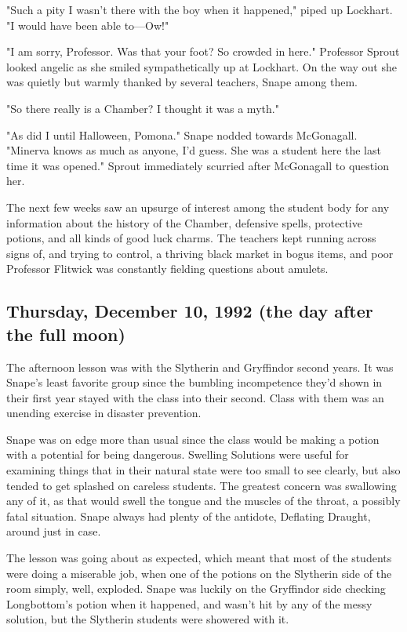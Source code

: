 "Such a pity I wasn't there with the boy when it happened," piped up Lockhart. "I would have been able to—Ow!"

"I am sorry, Professor. Was that your foot? So crowded in here." Professor Sprout looked angelic as she smiled sympathetically up at Lockhart. On the way out she was quietly but warmly thanked by several teachers, Snape among them.

"So there really is a Chamber? I thought it was a myth."

"As did I until Halloween, Pomona." Snape nodded towards McGonagall. "Minerva knows as much as anyone, I'd guess. She was a student here the last time it was opened." Sprout immediately scurried after McGonagall to question her.

The next few weeks saw an upsurge of interest among the student body for any information about the history of the Chamber, defensive spells, protective potions, and all kinds of good luck charms. The teachers kept running across signs of, and trying to control, a thriving black market in bogus items, and poor Professor Flitwick was constantly fielding questions about amulets.

\sbreak

\subsection{Thursday, December 10, 1992 (the day after the full moon)}

The afternoon lesson was with the Slytherin and Gryffindor second years. It was Snape's least favorite group since the bumbling incompetence they'd shown in their first year stayed with the class into their second. Class with them was an unending exercise in disaster prevention.

Snape was on edge more than usual since the class would be making a potion with a potential for being dangerous. Swelling Solutions were useful for examining things that in their natural state were too small to see clearly, but also tended to get splashed on careless students. The greatest concern was swallowing any of it, as that would swell the tongue and the muscles of the throat, a possibly fatal situation. Snape always had plenty of the antidote, Deflating Draught, around just in case.

The lesson was going about as expected, which meant that most of the students were doing a miserable job, when one of the potions on the Slytherin side of the room simply, well, exploded. Snape was luckily on the Gryffindor side checking Longbottom's potion when it happened, and wasn't hit by any of the messy solution, but the Slytherin students were showered with it.

